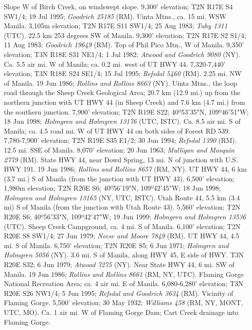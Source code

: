 Slope W of Birch Creek, on windswept slope. 9,300' elevation; T2N R17E S4 SW1/4;
19 Jul 1995; \textit{Goodrich 25185} (RM).
Uinta Mtns., ca. 15 mi. WSW Manila. 3,105m elevation; T2N R17E S11 SW1/4;
25 Aug 1983; \textit{Tuhy 1311} (UTC).
22.5 km 253 degrees SW of Manila. 9,300' elevation; T2N R17E S2 S1/4;
11 Aug 1983; \textit{Goodrich 19649} (RM).
Top of Phil Pico Mtn., W of Manila. 9,350' elevation; T3N R18E S31 NE1/4;
1 Jul 1982; \textit{Atwood and Goodrich 9080} (NY).
Ca. 5.5 air mi. W of Manila; ca. 0.2 mi. west of UT HWY 44. 7,320-7,440'
elevation; T3N R18E S24 SE1/4; 15 Jul 1995; \textit{Refsdal 5460} (RM).
2.25 mi. NW of Manila. 19 Jun 1986; \textit{Rollins and Rollins 8663} (NY).
Uinta Mtns., the loop road through the Sheep Creek Geological Area; 20.7 km
(12.9 mi.) up from the northern junction with UT HWY 44 (in Sheep Creek) and
7.6 km (4.7 mi.) from the southern junction. 7,900' elevation; T2N R19E S22;
40º53'35"N, 109º46'51"W; 18 Jun 1998;
\textit{Holmgren and Holmgren 13176} (UTC, ISTC).
Ca. 8.5 air mi. S of Manila; ca. 4.5 road mi. W of UT HWY 44 on both sides of
Forest RD 539. 7,780-7,900' elevation; T2N R19E S35 E1/2; 30 Jun 1994;
\textit{Refsdal 1390} (RM).
12.5 mi. SSE of Manila. 8,070' elevation; 20 Jun 1963;
\textit{Mulligan and Mosquin 2779} (RM).
State HWY 44, near Dowd Spring, 13 mi. N of junction with U.S. HWY 191.
19 Jun 1986; \textit{Rollins and Rollins 8657} (RM, NY).
UT HWY 44, 6 km (3.7 mi.) S of Manila (from the junction with UT HWY 43).
6,500' elevation; 1,980m elevation; T2N R20E S6;
40º56'19"N, 109º42'45"W; 18 Jun 1998;
\textit{Holmgren and Holmgren 13165} (NY, UTC, ISTC).
Utah Route 44, 5.5 km (3.4 mi) S of Manila (from the junction with Utah Route
43). 5,560' elevation; T2N R20E S6; 40º56'33"N, 109º42'47"W;
19 Jun 1999; \textit{Holmgren and Holmgren 13536} (UTC).
Sheep Creek Campground, ca. 4 mi. S of Manila. 6,100' elevation;
T2N R20E S8 SW1/4; 27 Jun 1979; \textit{Neese and Moore 7849} (RM).
UT HWY 44, 4.5 mi. S of Manila. 6,750' elevation; T2N R20E S5; 6 Jun 1971;
\textit{Holmgren and Holmgren 5056} (NY).
3.6 mi. S of Manila, along HWY 45, E side of HWY. T3N R20E S32; 6 Jun 1979;
\textit{Atwood 7275} (NY).
Near State HWY 44, 6 mi. SW of Manila. 19 Jun 1986;
\textit{Rollins and Rollins 8661} (RM, NY, UTC).
Flaming Gorge National Recreation Area; ca. 4 air mi. E of Manila.
6,080-6,280' elevation; T3N R20E S26 NW1/4; 5 Jun 1995;
\textit{Refsdal and Goodrich 3634} (RM).
Vicinity of Flaming Gorge. 5,500' elevation; 30 May 1932;
\textit{Williams 458} (RM, NY, MONT, UTC, MO).
Ca. 1 air mi. W of Flaming Gorge Dam; Cart Creek drainage into Flaming Gorge.
